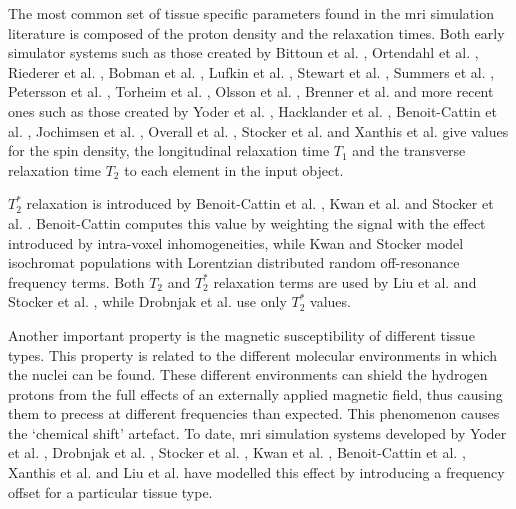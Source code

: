 \hfill

The most common set of tissue specific parameters 
found in the \ac{mri} simulation literature is composed of the proton density and the relaxation times.
Both early simulator systems such as those created by
Bittoun et al. \cite{Bittoun1984},
Ortendahl et al. \cite{Ortendahl1984},
Riederer et al. \cite{Riederer1984},
Bobman et al. \cite{Bobman1985},
Lufkin et al. \cite{Lufkin1986},
Stewart et al. \cite{Stewart1986},
Summers et al. \cite{Summers1986},
Petersson et al. \cite{Petersson1993},
Torheim et al. \cite{Torheim1994}, 
Olsson et al. \cite{Olsson1995},
Brenner et al. \cite{Brenner1997} and
more recent ones such as those created by
Yoder et al. \cite{Yoder2004},
Hacklander et al. \cite{Hacklander2005},
Benoit-Cattin et al. \cite{Benoit-Cattin2005},
Jochimsen et al. \cite{Jochimsen2004},
Overall et al. \cite{Overall2007},
Stocker et al. \cite{Stocker2010} and
Xanthis et al. \cite{Xanthis2014}
give values for the spin density, the longitudinal relaxation time $T_1$ and the transverse relaxation time $T_2$ to each element in the input object.

\hfill

$T_2^*$ relaxation is introduced by Benoit-Cattin et al. \cite{Benoit-Cattin2005},
Kwan et al. \cite{Kwan1999} 
and Stocker et al. \cite{Stocker2010}.
Benoit-Cattin computes this value by weighting the signal with the effect introduced by intra-voxel inhomogeneities,
while Kwan and Stocker model isochromat populations with Lorentzian distributed random off-resonance frequency terms.
Both $T_2$ and $T_2^*$ relaxation terms are used by Liu et al. \cite{Liu2017} and Stocker et al. \cite{Stocker2010}, while 
Drobnjak et al. \cite{Drobnjak2006} use only $T_2^*$ values.
 
\hfill

Another important property is the magnetic susceptibility of different tissue types.
This property is related to the different molecular environments in which the nuclei can be found.
These different environments can shield the hydrogen protons from the full effects of an externally applied magnetic field, thus causing them to precess at different frequencies than expected.
This phenomenon causes the `chemical shift' artefact.
To date, \ac{mri} simulation systems developed by
Yoder et al. \cite{Yoder2004}, 
Drobnjak et al. \cite{Drobnjak2006}, 
Stocker et al. \cite{Stocker2010}, 
Kwan et al. \cite{Kwan1999}, 
Benoit-Cattin et al. \cite{Benoit-Cattin2005}, 
Xanthis et al. \cite{Xanthis2014} and 
Liu et al. \cite{Liu2013} 
have modelled this effect by 
introducing a frequency offset for a particular tissue type.

